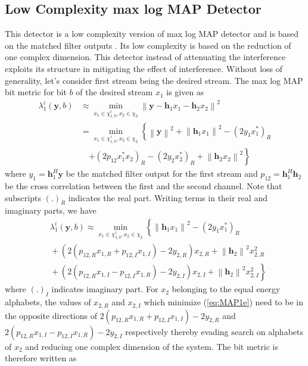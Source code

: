 \documentclass[a4paper,twocolumn,journal]{IEEEtran}
\begin{document}
\subsection{Low Complexity max log MAP Detector}
\label{sec:ML}
This detector is a low complexity version of max log MAP detector and is based on the matched filter outputs \cite{ghaffar09a}. Its low complexity is based on the reduction of one complex dimension. This detector instead of attenuating the interference exploits its structure in mitigating the effect of interference. Without loss of generality, let's consider first stream being the desired stream. The max log MAP bit metric for bit $b$ of the desired stream $x_{1}$ is given as \cite{caire}
\begin{align}
\lambda^{i}_{1}\left(\textbf{y},b\right)\!&\approx\! \min_{x_{1}\in\chi^{i}_{1,b},x_{2}\in\chi_{2}}\!\left\|\textbf{y}\!-\!\textbf{h}_{1}x_{1}\!-\textbf{h}_{2}x_{2}\right\|^{2}\nonumber\\
&=\!\min_{x_{1}\in\chi^{i}_{1,b},x_{2}\in\chi_{2}}\left\{\left\|\textbf{y}\right\|^{2}\!+\!\left\|\textbf{h}_{1}x_{1}\right\|^{2}\!-\left(2y_{1}x_{1}^{*}\right)_{R}\right.\nonumber\\
&\quad\left.+\left(2p_{12}x_{1}^{*}x_{2}\right)_{R}-\left(2y_{2}x_{2}^{*}\right)_{R}+\left\|\textbf{h}_{2}x_{2}\right\|^{2}\right\}\label{eq:bitLLR}
\end{align}
where $y_{1}=\textbf{h}_{1}^{H}\textbf{y}$ be the matched filter output for the first stream and $p_{12}=\textbf{h}_{1}^{H}\textbf{h}_{2}$ be the cross correlation between the first and the second channel. Note that subscripts $\left(.\right)_{R}$ indicates the real part. Writing terms in their real and imaginary parts, we have
\begin{align}
&\lambda^{i}_{1}\left(\textbf{y},b\right)\approx\min_{x_{1}\in\chi^{i}_{1,b},x_{2}\in\chi_{2}}\left\{\left\|\textbf{h}_{1}x_{1}\right\|^{2}-\left(2y_{1}x_{1}^{*}\right)_{R}\right.\nonumber\\
&\!+\!\left(2\left(p_{12,R}x_{1,R}\!+\!p_{12,I}x_{1,I}\!\right)\!-\!2 y_{2,R}\!\right)x_{2,R}\!+\!\left\|\textbf{h}_{2}\right\|^{2}x_{2,R}^{2}\nonumber\\
&\left.\!+\!\left(2\left(p_{12,R}x_{1,I}\!-\!p_{12,I}x_{1,R}\!\right)\!-\!2 y_{2,I}\!\right)x_{2,I}\!+\!\left\|\textbf{h}_{2}\right\|^{2}x_{2,I}^{2}\right\}\label{eq:MAP1e}
\end{align}
where $\left(.\right)_{I}$ indicates imaginary part. For $x_{2}$ belonging to the equal energy alphabets, the values of $x_{2,R}$ and $x_{2,I}$ which minimize (\ref{eq:MAP1e}) need to be in the opposite directions of $2\left(p_{12,R}x_{1,R}\!+\!p_{12,I}x_{1,I}\right)\!-\!2 y_{2,R}$ and $2\left(p_{12,R}x_{1,I}\!-\!p_{12,I}x_{1,R}\!\right)\!-\!2 y_{2,I}$ respectively thereby evading search on alphabets of $x_{2}$ and reducing one complex dimension of the system. The bit metric is therefore written as
\end{document}
